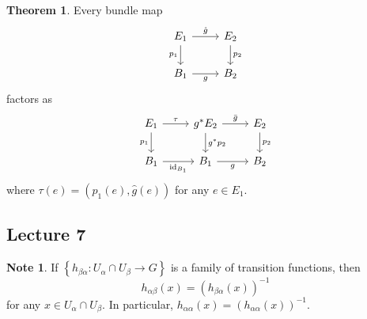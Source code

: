 \documentclass[10pt,letterpaper,cm]{nupset}
\theoremstyle{definition}
\newtheorem{note}[defn]{Note}
\theoremstyle{theorem}
\newtheorem{theorem}[defn]{Theorem}
\theoremstyle{remark}
\newcommand{\1}{\mathbb{1}}
\newcommand{\0}{\vec 0}
\DeclareMathOperator{\id}{id}
\begin{document}
\begin{theorem}\label{factors}
Every bundle map
\[
\begin{tikzcd}
E_1 \arrow[d, "p_1"'] \arrow[r, "\hat{g}"] & E_2 \arrow[d, "p_2"] \\
B_1 \arrow[r, "g"']                        & B_2                 
\end{tikzcd}
\]
factors as
\[
\begin{tikzcd}
E_1 \arrow[r, "\tau"] \arrow[d, "p_1"'] & g^{\ast}{E_2} \arrow[r, "\bar{g}"] \arrow[d, "g^{\ast}{p_2}"] & E_2 \arrow[d, "p_2"] \\
B_1 \arrow[r, "\id_{B_1}"']            & B_1 \arrow[r, "g"']                                           & B_2                 
\end{tikzcd}
\]
where $\tau(e) = \left(p_1(e), \hat{g}(e)\right)$ for any $e\in E_1$.
\end{theorem}

\subsection{Lecture 7}

\begin{note}\label{trnote}
If $\left\{h_{\beta{\alpha}}:U_{\alpha}\cap U_{\beta}\to G\right\}$ is a family of transition functions, then
\[
h_{\alpha{\beta}}(x) = \left(h_{\beta{\alpha}}(x)\right)^{-1}
\] for any $x\in U_{\alpha}\cap U_{\beta}$. In particular, $h_{\alpha{\alpha}}(x) = \left(h_{\alpha{\alpha}}(x)\right)^{-1}$.
\end{note}
\end{document}
